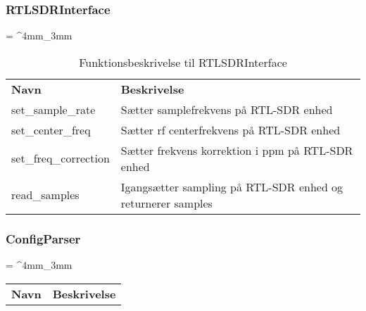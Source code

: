 \begin{appendices}
\subsubsection{RTLSDRInterface}

\begin{table}[H]
	\renewcommand{\arraystretch}{2}
	\centering
	\sffamily
	\tabulinesep = ^4mm_3mm
	\begin{tabu}{ m{4cm}  m{8.5cm} }
		\color{white}\bfseries Navn &\color{white}\bfseries Beskrivelse \\
		\rowfont{\color{black}}
		set\_sample\_rate  		& Sætter samplefrekvens på RTL-SDR enhed \\
		set\_center\_freq  		& Sætter rf centerfrekvens på RTL-SDR enhed \\
		set\_freq\_correction 	& Sætter frekvens korrektion i ppm på RTL-SDR enhed \\
		read\_samples 			& Igangsætter sampling på RTL-SDR enhed og returnerer samples \\
	\end{tabu}
	\caption{Funktionsbeskrivelse til RTLSDRInterface}
	\label{tab:func_descr_RTLSDRinterface}
\end{table}
\pagebreak 

\subsubsection{ConfigParser}
\begin{table}[H]
	\renewcommand{\arraystretch}{2}
	\centering
	\sffamily
	\tabulinesep = ^4mm_3mm
	\begin{tabu}{ m{4cm}  m{8.5cm} }
		\color{white}\bfseries Navn &\color{white}\bfseries Beskrivelse \\
		

\end{tabu}
\end{table}
\end{appendices}
